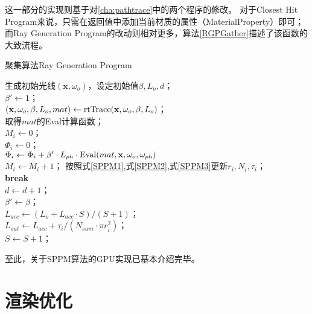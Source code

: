 这一部分的实现则基于对\ref{cha:pathtrace}中的两个程序的修改。
对于Closest Hit Program来说，只需在返回值中添加当前材质的属性（MaterialProperty）即可；
而Ray Generation Program的改动则相对更多，算法\ref{RGPGather}描述了该函数的大致流程。

\begin{algorithm}
    \caption{聚集算法Ray Generation Program}
    \label{RGPGather}
    生成初始光线$(\textbf{x}, \omega_o)$，设定初始值$\beta,L_o,d$；\\
    $\beta' \leftarrow 1$；\\
    {
        $(\textbf{x}, \omega_o, \beta, L_o, mat) \leftarrow {\rm rtTrace}(\textbf{x}, \omega_o, \beta, L_o)$；\\
        {
            取得$mat$的Eval计算函数；\\
            $M_i \leftarrow 0$；\\
            $\Phi_i \leftarrow 0$；\\
            {
                $\Phi_i \leftarrow \Phi_i + \beta' \cdot L_{ph}\cdot {\rm Eval}(mat, \textbf{x}, \omega_o, \omega_{ph})$\\
                $M_i \leftarrow M_i+1$；
            }
            按照式\ref{SPPM1},式\ref{SPPM2},式\ref{SPPM3}更新$r_i, N_i,\tau_i$；\\
            \textbf{break}\\
        }
        $d \leftarrow d+1$； \\
        $\beta' \leftarrow \beta$；\\
    }
    $L_{acc} \leftarrow (L_o+L_{acc}\cdot S)/(S+1)$；\\
    $L_{out} \leftarrow L_{acc}+\tau_i/(N_{sum}\cdot \pi r_i^2)$；\\
    $S \leftarrow S+1$；
\end{algorithm}

至此，关于SPPM算法的GPU实现已基本介绍完毕。

\section{渲染优化}


